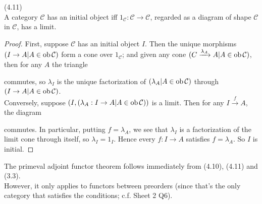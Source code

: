 \documentclass[a4paper]{article}
\begin{document}
\begin{lemma} (4.11)\\
    A category $\mathcal{C}$ has an initial object iff $1_{\mathcal{C}}:\mathcal{C} \to \mathcal{C}$, regarded as a diagram of shape $\mathcal{C}$ in $\mathcal{C}$, has a limit.
    \begin{proof}
        First, suppose $\mathcal{C}$ has an initial object $I$. Then the unique morphisms $(I \to A | A \in \operatorname{ob}\mathcal{C})$ form a cone over $1_{\mathcal{C}}$; and given any cone $(C \xrightarrow{\lambda_A} A |A \in \operatorname{ob}\mathcal{C})$, then for any $A$ the triangle 
        commutes, so $\lambda_I$ is the unique factorization of $(\lambda_A|A \in \operatorname{ob}\mathcal{C})$ through $(I \to A|A\in\operatorname{ob}\mathcal{C})$.\\
        Conversely, suppose $(I,(\lambda_A:I \to A|A \in \operatorname{ob}\mathcal{C}))$ is a limit. Then for any $I \xrightarrow{f} A$, the diagram
        commutes. In particular, putting $f = \lambda_A$, we see that $\lambda_I$ is a factorization of the limit cone through itself, so $\lambda_I = 1_I$. Hence every $f:I \to A$ satisfies $f=\lambda_A$. So $I$ is initial.
    \end{proof}
\end{lemma}

The primeval adjoint functor theorem follows immediately from (4.10), (4.11) and (3.3).\\
However, it only applies to functors between preorders (since that's the only category that satisfies the conditions; c.f. Sheet 2 Q6).
\end{document}
